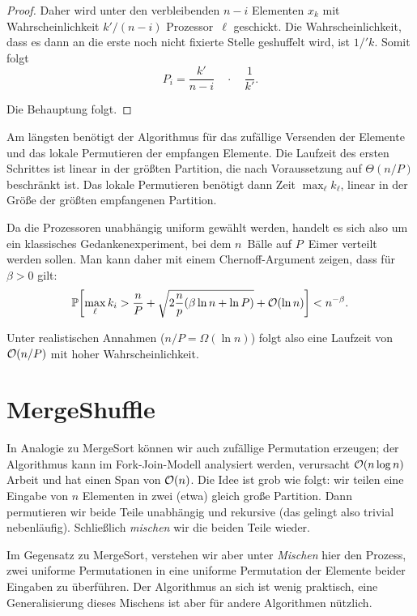 \begin{proof}
        Daher wird unter den verbleibenden $n-i$ Elementen $x_k$ mit Wahrscheinlichkeit $k' / (n-i)$ Prozessor~$\ell$ geschickt.
        Die Wahrscheinlichkeit, dass es dann an die erste noch nicht fixierte Stelle geshuffelt wird, ist $1 / 'k$.
        Somit folgt
        \begin{equation}
            P_i = \frac{k'}{n - i} \quad \cdot \quad \frac{1}{k'}.
        \end{equation}

        \noindent
        Die Behauptung folgt.
    \end{proof}
\fi

Am längsten benötigt der Algorithmus für das zufällige Versenden der Elemente und das lokale Permutieren der empfangen Elemente.
Die Laufzeit des ersten Schrittes ist linear in der größten Partition, die nach Voraussetzung auf $\Theta(n / P)$ beschränkt ist.
Das lokale Permutieren benötigt dann Zeit $\max_\ell k_\ell$, \dh linear in der Größe der größten empfangenen Partition.

Da die Prozessoren unabhängig uniform gewählt werden, handelt es sich also um ein klassisches Gedankenexperiment, bei dem $n$~Bälle auf $P$~Eimer verteilt werden sollen.
Man kann daher mit einem Chernoff-Argument zeigen, dass für $\beta > 0$ gilt:
\begin{equation}
    \mathbb{P}\!\left[\max_\ell k_i > \frac{n}{P} + \sqrt{2 \frac n p (\beta \ln n + \ln P)  } + \mathcal{O}\!\left(\ln n\right)\right] <  n^{-\beta}.
\end{equation}

Unter realistischen Annahmen ($n / P = \Omega(\ln n)$) folgt also eine Laufzeit von $\mathcal{O}\!\left(n / P\right)$ mit hoher Wahrscheinlichkeit.

\iffalse
    \section{MergeShuffle}
    In Analogie zu MergeSort können wir auch zufällige Permutation erzeugen;
    der Algorithmus kann im Fork-Join-Modell analysiert werden, verursacht $\mathcal{O}\!\left(n \log n\right)$ Arbeit und hat einen Span von $\mathcal{O}\!\left(n\right)$.
    Die Idee ist grob wie folgt:
    wir teilen eine Eingabe von $n$ Elementen in zwei (etwa) gleich große Partition.
    Dann permutieren wir beide Teile unabhängig und rekursive (das gelingt also trivial nebenläufig).
    Schließlich \emph{mischen} wir die beiden Teile wieder.

    Im Gegensatz zu MergeSort, verstehen wir aber unter \emph{Mischen} hier den Prozess,
    zwei uniforme Permutationen in eine uniforme Permutation der Elemente beider Eingaben zu überführen.
    Der Algorithmus an sich ist wenig praktisch, eine Generalisierung dieses Mischens ist aber für andere Algorithmen nützlich.

